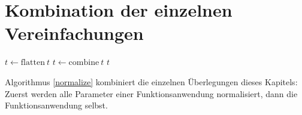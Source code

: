 \section{Kombination der einzelnen Vereinfachungen} \label{subsecKomboNormal}

\begin{algorithm}
\DontPrintSemicolon
\caption{$\mathrm{normalize} \colon T \rightarrow T$}\label{normalize}

$t \leftarrow \mathrm{flatten}~t$\;
$t \leftarrow \mathrm{combine}~t$\;
\Return $t$ 
\end{algorithm}
Algorithmus \ref{normalize} kombiniert die einzelnen Überlegungen dieses Kapitels: Zuerst werden alle Parameter einer Funktionsanwendung normalisiert, dann die Funktionsanwendung selbst.





